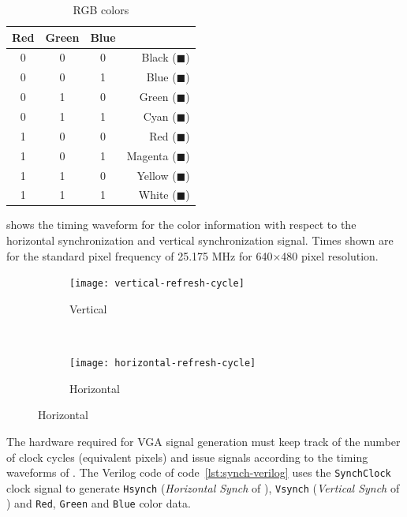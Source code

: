 \documentclass[12pt, logo=tehranDLDL/ut]{tehranDLDL}
\begin{document}
\begin{table}
\centering
\caption{RGB colors\label{tab:rgb}}
\begin{tabular}{cccr}
Red & Green & Blue & ~\\
\hline
0 & 0 & 0 & Black (\textcolor[rgb]{0,0,0}{$\blacksquare$})\\
0 & 0 & 1 & Blue (\textcolor[rgb]{0,0,1}{$\blacksquare$})\\
0 & 1 & 0 & Green (\textcolor[rgb]{0,1,0}{$\blacksquare$})\\
0 & 1 & 1 & Cyan (\textcolor[rgb]{0,1,1}{$\blacksquare$})\\
1 & 0 & 0 & Red (\textcolor[rgb]{1,0,0}{$\blacksquare$})\\
1 & 0 & 1 & Magenta (\textcolor[rgb]{1,0,1}{$\blacksquare$})\\
1 & 1 & 0 & Yellow (\textcolor[rgb]{1,1,0}{$\blacksquare$})\\
1 & 1 & 1 & White (\textcolor[rgb]{1,1,1}{$\blacksquare$})\\
\end{tabular}
\end{table}

 shows the timing waveform for the color information with respect to the horizontal synchronization and vertical synchronization signal. Times shown are for the standard pixel frequency of 25.175 MHz for 640×480 pixel resolution.

\begin{figure}
    \centering
    \caption{Refresh cycle\label{fig:refresh-cycle}}
    \begin{subfigure}[t]{0.48\textwidth}
        \caption{Vertical\label{fig:vertical-refresh-cycle}}
        \texttt{[image: vertical-refresh-cycle]}
    \end{subfigure}
    ~
    \begin{subfigure}[t]{0.48\textwidth}
        \caption{Horizontal\label{fig:horizontal-refresh-cycle}}
        \texttt{[image: horizontal-refresh-cycle]}
    \end{subfigure}
\end{figure}

The hardware required for VGA signal generation must keep track of the number of clock cycles (equivalent pixels) and issue signals according to the timing waveforms of . The Verilog code of code~\ref{lst:synch-verilog} uses the \lstinline{SynchClock} clock signal to generate \lstinline{Hsynch} (\textit{Horizontal Synch} of ), \lstinline{Vsynch} (\textit{Vertical Synch} of ) and \lstinline{Red}, \lstinline{Green} and \lstinline{Blue} color data.
\end{document}
